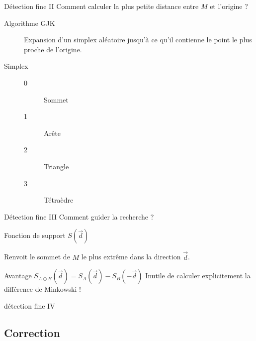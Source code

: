 \documentclass{beamer}
\begin{document}
\begin{frame}{Détection fine II}
  Comment calculer la plus petite distance entre $M$ et l'origine ?

  \vfill

  \begin{description}
  \item[Algorithme GJK]
    Expansion d'un simplex aléatoire jusqu'à ce qu'il contienne le point le plus proche de l'origine.
  \end{description}

  \vfill

  \begin{description}
  \item[Simplex]
    \begin{description}
    \item[0] Sommet
    \item[1] Arête
    \item[2] Triangle
    \item[3] Tétraèdre
    \end{description}
  \end{description}
\end{frame}

\begin{frame}{Détection fine III}
  Comment guider la recherche ?

  \vfill

  Fonction de support $S(\vec{d})$

  Renvoit le sommet de $M$ le plus extrême dans la direction $\vec{d}$.

  Avantage  $S_{A \ominus B}(\vec{d}) = S_A(\vec{d}) - S_B(-\vec{d})$
  Inutile de calculer explicitement la différence de Minkowski !
\end{frame}

\begin{frame}{détection fine IV}
  \begin{figure}
    \centering
    
    
    
    
    
    
  \end{figure}
\end{frame}

\subsection{Correction}
\end{document}
